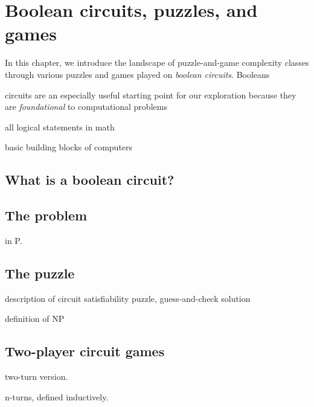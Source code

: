 \chapter{Boolean circuits, puzzles, and games}

In this chapter, we introduce the landscape of puzzle-and-game complexity
classes through various puzzles and games played on \emph{boolean circuits}.
Booleans


circuits are an especially useful starting point for our exploration because
they are \emph{foundational} to computational problems

all logical statements in math

basic building blocks of computers


\section{What is a boolean circuit?}


\section{The  problem}

in P.

\section{The  puzzle}

description of circuit satisfiability puzzle, guess-and-check solution

definition of NP

\section{Two-player circuit games}

two-turn version.


n-turns, defined inductively.
